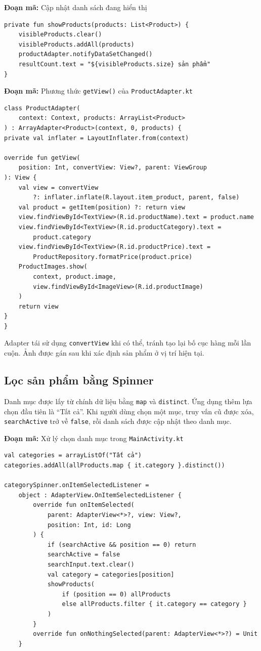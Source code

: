 \documentclass[12pt,a4paper]{article}
\newcommand{\codepath}[1]{\nolinkurl{#1}}
\newcommand{\codecaption}[1]{\par\noindent\textbf{Đoạn mã:} #1\par\vspace{3pt}}
\begin{document}
\codecaption{Cập nhật danh sách đang hiển thị}
\begin{Verbatim}[fontsize=\small,breaklines=true,frame=single]
private fun showProducts(products: List<Product>) {
    visibleProducts.clear()
    visibleProducts.addAll(products)
    productAdapter.notifyDataSetChanged()
    resultCount.text = "${visibleProducts.size} sản phẩm"
}
\end{Verbatim}

\codecaption{Phương thức \texttt{getView()} của \codepath{ProductAdapter.kt}}
\begin{Verbatim}[fontsize=\small,breaklines=true,frame=single]
class ProductAdapter(
    context: Context, products: ArrayList<Product>
) : ArrayAdapter<Product>(context, 0, products) {
private val inflater = LayoutInflater.from(context)

override fun getView(
    position: Int, convertView: View?, parent: ViewGroup
): View {
    val view = convertView
        ?: inflater.inflate(R.layout.item_product, parent, false)
    val product = getItem(position) ?: return view
    view.findViewById<TextView>(R.id.productName).text = product.name
    view.findViewById<TextView>(R.id.productCategory).text =
        product.category
    view.findViewById<TextView>(R.id.productPrice).text =
        ProductRepository.formatPrice(product.price)
    ProductImages.show(
        context, product.image,
        view.findViewById<ImageView>(R.id.productImage)
    )
    return view
}
}
\end{Verbatim}

\noindent Adapter tái sử dụng \texttt{convertView} khi có thể, tránh tạo lại
bố cục hàng mỗi lần cuộn. Ảnh được gán sau khi xác định sản phẩm ở vị trí hiện tại.

\subsection{Lọc sản phẩm bằng Spinner}
Danh mục được lấy từ chính dữ liệu bằng \texttt{map} và \texttt{distinct}.
Ứng dụng thêm lựa chọn đầu tiên là “Tất cả”. Khi người dùng chọn một mục,
truy vấn cũ được xóa, \texttt{searchActive} trở về \texttt{false}, rồi danh sách
được cập nhật theo danh mục.

\codecaption{Xử lý chọn danh mục trong \codepath{MainActivity.kt}}
\begin{Verbatim}[fontsize=\small,breaklines=true,frame=single]
val categories = arrayListOf("Tất cả")
categories.addAll(allProducts.map { it.category }.distinct())

categorySpinner.onItemSelectedListener =
    object : AdapterView.OnItemSelectedListener {
        override fun onItemSelected(
            parent: AdapterView<*>?, view: View?,
            position: Int, id: Long
        ) {
            if (searchActive && position == 0) return
            searchActive = false
            searchInput.text.clear()
            val category = categories[position]
            showProducts(
                if (position == 0) allProducts
                else allProducts.filter { it.category == category }
            )
        }
        override fun onNothingSelected(parent: AdapterView<*>?) = Unit
    }
\end{Verbatim}
\end{document}

